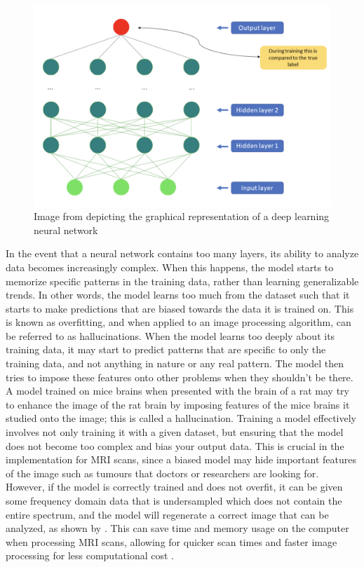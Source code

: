 \documentclass[14pt]{extreport}
\begin{document}
        \begin{figure}[h]
            \begin{center}
                \includegraphics[width = 0.6\linewidth]{Neural Network.png}
                \caption{Image from \cite{Lundervold_Lundervold_2019} depicting the graphical representation of a deep learning neural network}
            \end{center}
        \end{figure}

        In the event that a neural network contains too many layers, its ability to analyze data becomes increasingly complex. When this happens, the model starts to memorize specific patterns in the training data, rather than learning generalizable trends. In other words, the model learns too much from the dataset such that it starts to make predictions that are biased towards the data it is trained on. This is known as overfitting, and when applied to an image processing algorithm, can be referred to as hallucinations. When the model learns too deeply about its training data, it may start to predict patterns that are specific to only the training data, and not anything in nature or any real pattern. The model then tries to impose these features onto other problems when they shouldn't be there. A model trained on mice brains when presented with the brain of a rat may try to enhance the image of the rat brain by imposing features of the mice brains it studied onto the image; this is called a hallucination. Training a model effectively involves not only training it with a given dataset, but ensuring that the model does not become too complex and bias your output data. This is crucial in the implementation for MRI scans, since a biased model may hide important features of the image such as tumours that doctors or researchers are looking for. However, if the model is correctly trained and does not overfit, it can be given some frequency domain data that is undersampled which does not contain the entire spectrum, and the model will regenerate a correct image that can be analyzed, as shown by \cite{Hyun_Kim_Lee_Lee_Seo_2018}. This can save time and memory usage on the computer when processing MRI scans, allowing for quicker scan times and faster image processing for less computational cost \cite{Hyun_Kim_Lee_Lee_Seo_2018}. 
\end{document}

